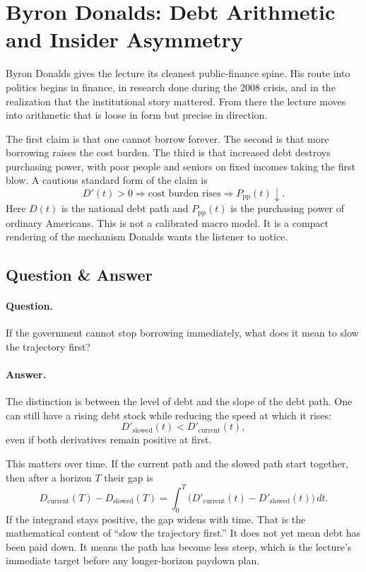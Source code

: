 \section{Byron Donalds: Debt Arithmetic and Insider Asymmetry}

Byron Donalds gives the lecture its cleanest public-finance spine. His route into politics begins in finance, in research done during the 2008 crisis, and in the realization that the institutional story mattered. From there the lecture moves into arithmetic that is loose in form but precise in direction.

The first claim is that one cannot borrow forever. The second is that more borrowing raises the cost burden. The third is that increased debt destroys purchasing power, with poor people and seniors on fixed incomes taking the first blow. A cautious standard form of the claim is
\begin{equation}
D'(t)>0 \Rightarrow \text{cost burden rises} \Rightarrow P_{\text{pp}}(t)\downarrow.
\end{equation}
Here $D(t)$ is the national debt path and $P_{\text{pp}}(t)$ is the purchasing power of ordinary Americans. This is not a calibrated macro model. It is a compact rendering of the mechanism Donalds wants the listener to notice.

\subsection{Question \& Answer}

\paragraph{Question.} If the government cannot stop borrowing immediately, what does it mean to slow the trajectory first?

\paragraph{Answer.} The distinction is between the level of debt and the slope of the debt path. One can still have a rising debt stock while reducing the speed at which it rises:
\begin{equation}
D'_{\text{slowed}}(t)<D'_{\text{current}}(t),
\end{equation}
even if both derivatives remain positive at first.

This matters over time. If the current path and the slowed path start together, then after a horizon $T$ their gap is
\begin{equation}
D_{\text{current}}(T)-D_{\text{slowed}}(T)
=
\int_0^T \bigl(D'_{\text{current}}(t)-D'_{\text{slowed}}(t)\bigr)\,dt.
\end{equation}
If the integrand stays positive, the gap widens with time. That is the mathematical content of ``slow the trajectory first.'' It does not yet mean debt has been paid down. It means the path has become less steep, which is the lecture's immediate target before any longer-horizon paydown plan.

